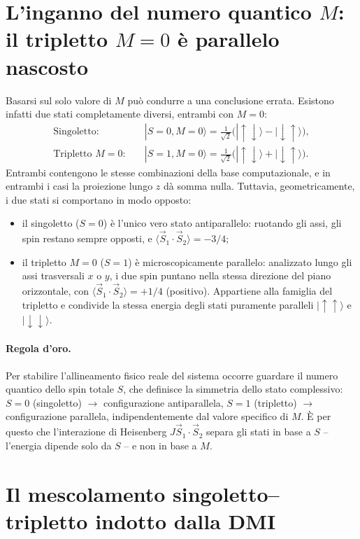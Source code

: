 \documentclass[11pt,a4paper]{article}
\begin{document}
\section{L'inganno del numero quantico $M$: il tripletto $M=0$ \`e parallelo nascosto}

Basarsi sul solo valore di $M$ pu\`o condurre a una conclusione errata. Esistono
infatti due stati completamente diversi, entrambi con $M=0$:
\begin{align}
\text{Singoletto:} \quad & |S=0,M=0\rangle=\frac1{\sqrt2}\big(|\!\uparrow\downarrow\rangle-|\!\downarrow\uparrow\rangle\big), \\
\text{Tripletto } M=0: \quad & |S=1,M=0\rangle=\frac1{\sqrt2}\big(|\!\uparrow\downarrow\rangle+|\!\downarrow\uparrow\rangle\big).
\end{align}
Entrambi contengono le stesse combinazioni della base computazionale, e in entrambi i
casi la proiezione lungo $z$ d\`a somma nulla. Tuttavia, geometricamente, i due stati
si comportano in modo opposto:
\begin{itemize}
\item il singoletto ($S=0$) \`e l'unico vero stato antiparallelo: ruotando gli assi,
gli spin restano sempre opposti, e $\langle\vec S_1\cdot\vec S_2\rangle=-3/4$;
\item il tripletto $M=0$ ($S=1$) \`e microscopicamente parallelo: analizzato lungo gli
assi trasversali $x$ o $y$, i due spin puntano nella stessa direzione del piano
orizzontale, con $\langle\vec S_1\cdot\vec S_2\rangle=+1/4$ (positivo). Appartiene alla
famiglia del tripletto e condivide la stessa energia degli stati puramente paralleli
$|\!\uparrow\uparrow\rangle$ e $|\!\downarrow\downarrow\rangle$.
\end{itemize}

\paragraph{Regola d'oro.} Per stabilire l'allineamento fisico reale del sistema occorre
guardare il numero quantico dello spin totale $S$, che definisce la simmetria dello
stato complessivo: $S=0$ (singoletto) $\to$ configurazione antiparallela, $S=1$
(tripletto) $\to$ configurazione parallela, indipendentemente dal valore specifico di
$M$. \`E per questo che l'interazione di Heisenberg $J\vec S_1\cdot\vec S_2$ separa gli
stati in base a $S$ -- l'energia dipende solo da $S$ -- e non in base a $M$.

\section{Il mescolamento singoletto--tripletto indotto dalla DMI}
\end{document}
